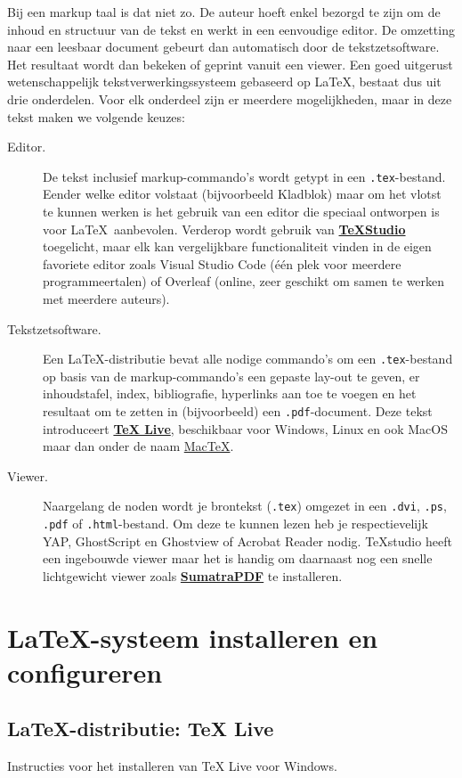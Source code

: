\documentclass[kulak]{kulakarticle} %
\begin{document}
Bij een markup taal is dat niet zo. De auteur hoeft enkel bezorgd te zijn om de inhoud en structuur van de tekst en werkt in een eenvoudige editor. De omzetting naar een leesbaar document gebeurt dan automatisch door de tekstzetsoftware. Het resultaat wordt dan bekeken of geprint vanuit een viewer. Een goed uitgerust wetenschappelijk tekstverwerkingssysteem gebaseerd op \LaTeX, bestaat dus uit drie onderdelen. Voor elk onderdeel zijn er meerdere mogelijkheden, maar in deze tekst maken we volgende keuzes:
\begin{description}
	\item[Editor.] De tekst inclusief markup-commando's wordt getypt in een \texttt{.tex}-bestand. Eender welke editor volstaat (bijvoorbeeld Kladblok) maar om het vlotst te kunnen werken is het gebruik van een editor die speciaal ontworpen is voor \LaTeX\ aanbevolen. Verderop wordt gebruik van \href{http://texstudio.sourceforge.net/}{\textbf{TeXStudio}} toegelicht, maar elk kan vergelijkbare functionaliteit vinden in de eigen favoriete editor zoals Visual Studio Code (één plek voor meerdere programmeertalen) of Overleaf (online, zeer geschikt om samen te werken met meerdere auteurs).
	\item[Tekstzetsoftware.] Een \LaTeX-distributie bevat alle nodige commando's om een \texttt{.tex}-bestand op basis van de markup-commando's een gepaste lay-out te geven, er inhoudstafel, index, bibliografie, hyperlinks aan toe te voegen  en het resultaat om te zetten in (bijvoorbeeld) een \texttt{.pdf}-document. Deze tekst introduceert \href{http://www.tug.org/texlive/}{\textbf{TeX Live}}, beschikbaar voor Windows, Linux en ook MacOS maar dan onder de naam \href{http://www.tug.org/mactex}{MacTeX}.
	\item[Viewer.] Naargelang de noden wordt je brontekst (\texttt{.tex}) omgezet in een \texttt{.dvi}, \texttt{.ps}, \texttt{.pdf} of \texttt{.html}-bestand. Om deze te kunnen lezen heb je respectievelijk YAP, GhostScript en Ghostview of Acrobat Reader nodig. TeXstudio heeft een ingebouwde viewer maar het is handig om daarnaast nog een snelle lichtgewicht viewer zoals \href{https://www.sumatrapdfreader.org/}{\textbf{SumatraPDF}} te installeren.
\end{description}

\section{\LaTeX-systeem installeren en configureren}
\label{sec:texlive}
\subsection{\LaTeX-distributie: TeX Live}
Instructies voor het installeren van TeX Live voor Windows.
\end{document}

